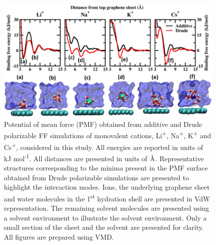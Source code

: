 \begin{figure}
    \centering
    \includegraphics[width=\textwidth]{Chapter3/Figures/Figure2.png}
    \caption[Potential of mean force (PMF) obtained from additive and Drude polarizable FF simulations of monovalent cations considered in this study. Representative structures corresponding to the minima present in the PMF surface obtained from Drude polarizable simulations are also presented to highlight the different interaction modes]{Potential of mean force (PMF) obtained from additive and Drude polarizable FF simulations of monovalent cations, Li\textsuperscript{+}, Na\textsuperscript{+}, K\textsuperscript{+} and Cs\textsuperscript{+}, considered in this study. All energies are reported in units of kJ mol\textsuperscript{-1}. All distances are presented in units of $\text{\normalfont\AA}$. Representative structures corresponding to the minima present in the PMF surface obtained from Drude polarizable simulations are presented to highlight the interaction modes. Ions, the underlying graphene sheet and water molecules in the 1\textsuperscript{st} hydration shell are presented in VdW representation. The remaining solvent molecules are presented using a solvent environment to illustrate the solvent environment. Only a small section of the sheet and the solvent are presented for clarity. All figures are prepared using VMD.\supercite{humphrey_vmd_1996}}
\end{figure}

